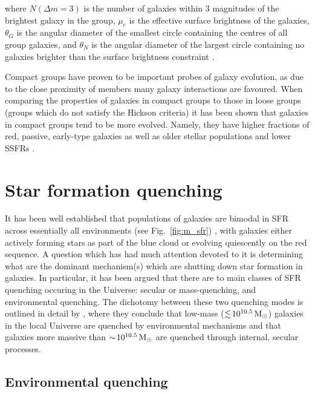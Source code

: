 \noindent
where $N(\Delta m = 3)$ is the number of galaxies within 3 magnitudes
of the brightest galaxy in the group, $\mu_e$ is the effective surface
brightness of the galaxies, $\theta_G$ is the angular diameter of the
smallest circle containing the centres of all group galaxies, and
$\theta_N$ is the angular diameter of the largest circle containing no
galaxies brighter than the surface brightness constraint
\citep{hickson1982, mcconnachie2009}.
\par
Compact groups have proven to be important probes of galaxy evolution,
as due to the close proximity of members many galaxy interactions are
favoured.  When comparing the properties of galaxies in compact groups
to those in loose groups (groups which do not satisfy the Hickson
criteria) it has been shown that galaxies in compact groups tend to be
more evolved.  Namely, they have higher fractions of red, passive,
early-type galaxies as well as older stellar populations and lower
SSFRs \citep{coenda2012, coenda2015}.

\section{Star formation quenching}
\label{sec:sfr_quench}

It has been well established that populations of galaxies are bimodal
in SFR across essentially all environments (see Fig.~\ref{fig:m_sfr})
\citep[e.g.][]{wetzel2012}, with galaxies either actively forming
stars as
part of the blue cloud or evolving quiescently on the red sequence.  A
question which has had much attention devoted to it is determining
what are the dominant mechanism(s) which are shutting down star
formation in galaxies.  In particular, it has been argued that there
are to main classes of SFR quenching occuring in the Universe: secular
or mass-quenching, and environmental quenching.  The dichotomy between
these two quenching modes is outlined in detail by \citet{peng2010},
where they conclude that low-mass ($\lesssim \! 10^{10.5}\,\mathrm{M_{\odot}}$)
galaxies in the local Universe are quenched by environmental
mechanisms and that galaxies more massive than $\sim \!
10^{10.5}\,\mathrm{M_{\odot}}$ are quenched through internal, secular processes.  

\subsection{Environmental quenching}
\label{sec:enviro_quench}

